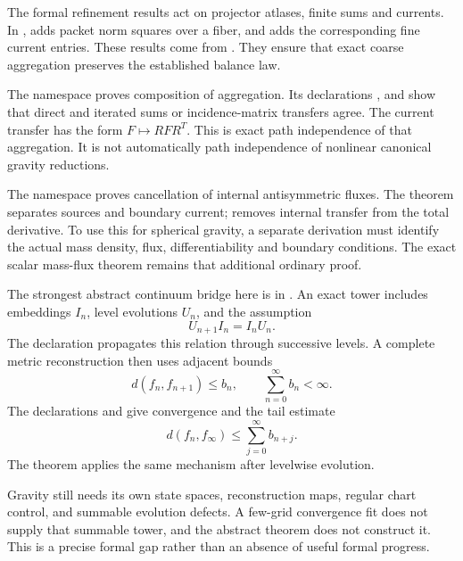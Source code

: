 The formal refinement results act on projector atlases, finite sums and currents. In ,  adds packet norm squares over a fiber, and  adds the corresponding fine current entries. These results come from . They ensure that exact coarse aggregation preserves the established balance law.

The namespace  proves composition of aggregation. Its declarations ,  and  show that direct and iterated sums or incidence-matrix transfers agree. The current transfer has the form \(F\mapsto RFR^T\). This is exact path independence of that aggregation. It is not automatically path independence of nonlinear canonical gravity reductions.

The namespace  proves cancellation of internal antisymmetric fluxes. The theorem  separates sources and boundary current;  removes internal transfer from the total derivative. To use this for spherical gravity, a separate derivation must identify the actual mass density, flux, differentiability and boundary conditions. The exact scalar mass-flux theorem remains that additional ordinary proof.

The strongest abstract continuum bridge here is in . An exact tower includes embeddings \(I_n\), level evolutions \(U_n\), and the assumption
\[
 U_{n+1}I_n=I_nU_n.
\]
The declaration  propagates this relation through successive levels. A complete metric reconstruction then uses adjacent bounds
\[
 d(f_n,f_{n+1})\le b_n,
 \qquad \sum_{n=0}^{\infty}b_n<\infty.
\]
The declarations  and  give convergence and the tail estimate
\[
 d(f_n,f_\infty)\le\sum_{j=0}^{\infty}b_{n+j}.
\]
The theorem  applies the same mechanism after levelwise evolution.

Gravity still needs its own state spaces, reconstruction maps, regular chart control, and summable evolution defects. A few-grid convergence fit does not supply that summable tower, and the abstract theorem does not construct it. This is a precise formal gap rather than an absence of useful formal progress.


